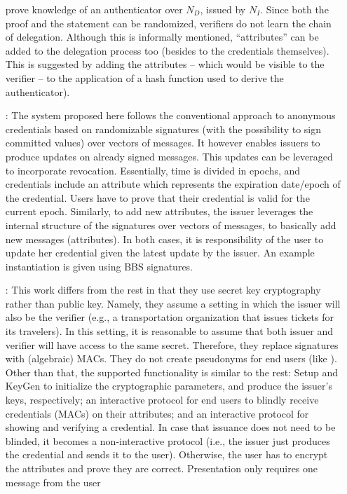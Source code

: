 \begin{enumerate}
  prove knowledge of an authenticator over $N_D$, issued by $N_I$. Since
  both the proof and the statement can be randomized, verifiers do not
  learn the chain of delegation.  Although this is informally mentioned,
  ``attributes'' can be added to the delegation process too (besides to the
  credentials themselves). This is suggested by adding the attributes -- which
  would be visible to the verifier -- to the application of a hash function
  used to derive the authenticator). 
\item[\cite{cks10}:] The system proposed here follows the conventional
  approach to anonymous credentials based on randomizable signatures (with
  the possibility to sign committed values) over vectors of messages.
  It however enables issuers to produce updates on already signed messages.
  This updates can be leveraged to incorporate revocation. Essentially,
  time is divided in epochs, and credentials include an attribute which
  represents the expiration date/epoch of the credential. Users have to
  prove that their credential is valid for the current epoch. Similarly,
  to add new attributes, the issuer leverages the internal structure of
  the signatures over vectors of messages, to basically add new messages
  (attributes). In both cases, it is responsibility of the user to update
  her credential given the latest update by the issuer. An example
  instantiation is given using BBS signatures.
\item[\cite{cmz14}:] This work differs from the rest in that they use
  secret key cryptography rather than public key. Namely, they assume a
  setting in which the issuer will also be the verifier (e.g., a
  transportation organization that issues tickets for its travelers). In
  this setting, it is reasonable to assume that both issuer and verifier
  will have access to the same secret. Therefore, they replace signatures
  with (algebraic) MACs. They do not create pseudonyms for end users (like
  \cite{sms+19}). Other than that, the supported functionality is similar
  to the rest: Setup and KeyGen to initialize the cryptographic parameters,
  and produce the issuer's keys, respectively; an interactive protocol for
  end users to blindly receive credentials (MACs) on their attributes; and
  an interactive protocol for showing and verifying a credential. In case
  that issuance does not need to be blinded, it becomes a non-interactive
  protocol (i.e., the issuer just produces the credential and sends it to
  the user). Otherwise, the user has to encrypt the attributes and prove
  they are correct. Presentation only requires one message from the user

\end{enumerate}
